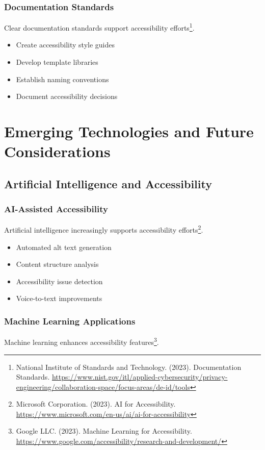 \subsubsection{Documentation Standards}
Clear documentation standards support accessibility efforts\footnote{National Institute of Standards and Technology. (2023). Documentation Standards. \url{https://www.nist.gov/itl/applied-cybersecurity/privacy-engineering/collaboration-space/focus-areas/de-id/tools}}.

\begin{itemize}
\item Create accessibility style guides
\item Develop template libraries
\item Establish naming conventions
\item Document accessibility decisions
\end{itemize}

\section{Emerging Technologies and Future Considerations}
\label{sec:emerging-tech}

\subsection{Artificial Intelligence and Accessibility}

\subsubsection{AI-Assisted Accessibility}
Artificial intelligence increasingly supports accessibility efforts\footnote{Microsoft Corporation. (2023). AI for Accessibility. \url{https://www.microsoft.com/en-us/ai/ai-for-accessibility}}.

\begin{itemize}
\item Automated alt text generation
\item Content structure analysis
\item Accessibility issue detection
\item Voice-to-text improvements
\end{itemize}

\subsubsection{Machine Learning Applications}
Machine learning enhances accessibility features\footnote{Google LLC. (2023). Machine Learning for Accessibility. \url{https://www.google.com/accessibility/research-and-development/}}.

